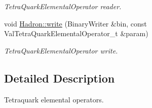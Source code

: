 \begin{DoxyCompactItemize}
\begin{DoxyCompactList}\small\item\em Tetra\+Quark\+Elemental\+Operator reader. \end{DoxyCompactList}\item 
void \mbox{\hyperlink{namespaceHadron_ac78ff88ef705b3eaa48d7d440fe2a299}{Hadron\+::write}} (Binary\+Writer \&bin, const Val\+Tetra\+Quark\+Elemental\+Operator\+\_\+t \&param)
\begin{DoxyCompactList}\small\item\em Tetra\+Quark\+Elemental\+Operator write. \end{DoxyCompactList}\end{DoxyCompactItemize}


\subsection{Detailed Description}
Tetraquark elemental operators. 

